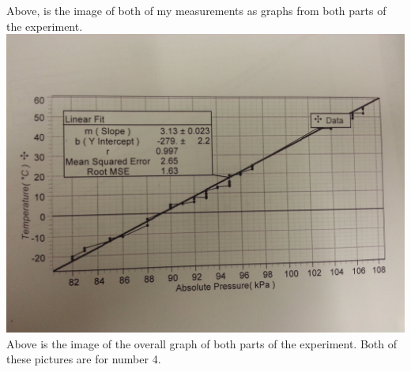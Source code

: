 \documentclass[12pt]{report}
\begin{document}
Above, is the image of both of my measurements as graphs from both parts of the experiment.\\
\includegraphics[scale=0.2]{OverallGraphs}
Above is the image of the overall graph of both parts of the experiment.
Both of these pictures are for number 4.
\end{document}
